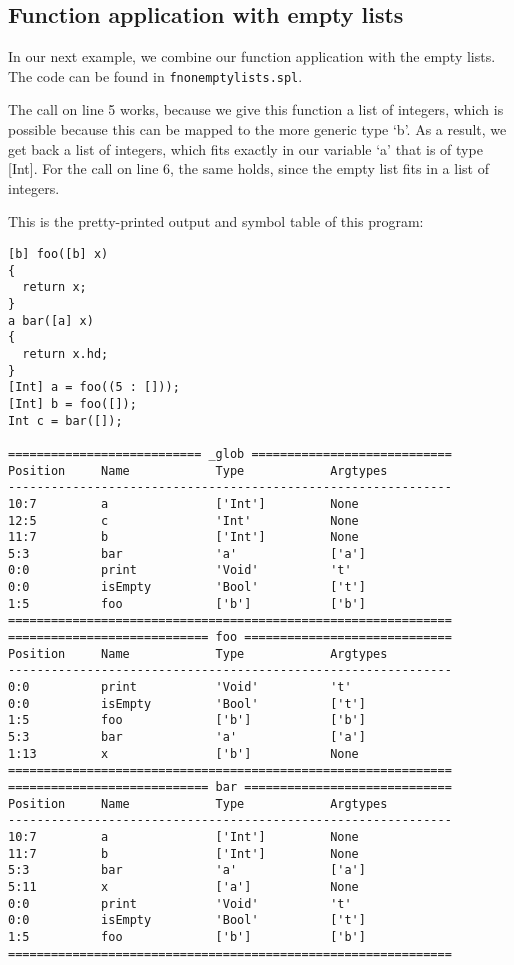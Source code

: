 \documentclass[a4paper]{article}
\begin{document}
\subsection{Function application with empty lists}
In our next example, we combine our function application with the empty lists. The code can be found in {\tt fnonemptylists.spl}.

The call on line 5 works, because we give this function a list of integers, which is possible because this can be mapped to the more generic type `b'. As a result, we get back a list of integers, which fits exactly in our variable `a' that is of type [Int]. For the call on line 6, the same holds, since the empty list fits in a list of integers. 

This is the pretty-printed output and symbol table of this program: 
\begin{verbatim}
[b] foo([b] x)
{
  return x;
}
a bar([a] x)
{
  return x.hd;
}
[Int] a = foo((5 : []));
[Int] b = foo([]);
Int c = bar([]);

=========================== _glob ============================
Position     Name            Type            Argtypes            
--------------------------------------------------------------
10:7         a               ['Int']         None                
12:5         c               'Int'           None                
11:7         b               ['Int']         None                
5:3          bar             'a'             ['a']               
0:0          print           'Void'          't'                 
0:0          isEmpty         'Bool'          ['t']               
1:5          foo             ['b']           ['b']               
==============================================================
============================ foo =============================
Position     Name            Type            Argtypes            
--------------------------------------------------------------
0:0          print           'Void'          't'                 
0:0          isEmpty         'Bool'          ['t']               
1:5          foo             ['b']           ['b']               
5:3          bar             'a'             ['a']               
1:13         x               ['b']           None                
==============================================================
============================ bar =============================
Position     Name            Type            Argtypes            
--------------------------------------------------------------
10:7         a               ['Int']         None                
11:7         b               ['Int']         None                
5:3          bar             'a'             ['a']               
5:11         x               ['a']           None                
0:0          print           'Void'          't'                 
0:0          isEmpty         'Bool'          ['t']               
1:5          foo             ['b']           ['b']               
==============================================================
\end{verbatim}
\end{document}
